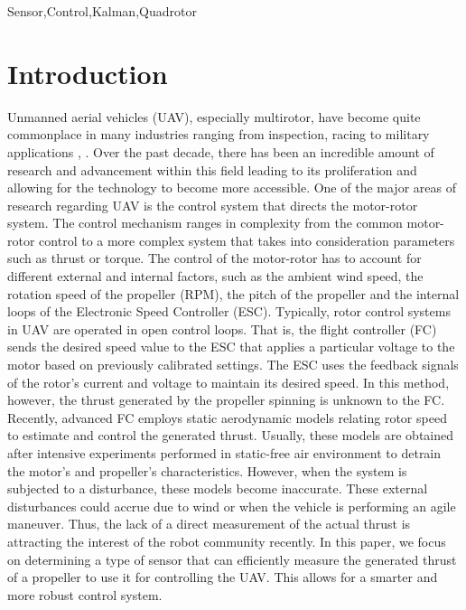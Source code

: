 \documentclass[conference]{IEEEtran}
\begin{document}
\begin{IEEEkeywords}
Sensor,Control,Kalman,Quadrotor
\end{IEEEkeywords}

\section{Introduction}
Unmanned aerial vehicles (UAV), especially multirotor, have become quite commonplace in many industries ranging from inspection, racing to military applications \cite{bara}, \cite{Mathe}. Over the past decade, there has been an incredible amount of research and advancement within this field leading to its proliferation and allowing for the technology to become more accessible. One of the major areas of research regarding UAV is the control system that directs the motor-rotor system. The control mechanism ranges in complexity from the common motor-rotor control to a more complex system that takes into consideration parameters such as thrust or torque. The control of the motor-rotor has to account for different external and internal factors, such as the ambient wind speed, the rotation speed of the propeller (RPM), the pitch of the propeller and the internal loops of the Electronic Speed Controller (ESC). Typically, rotor control systems in UAV are operated in open control loops. That is, the flight controller (FC) sends the desired speed value to the ESC that applies a particular voltage to the motor based on previously calibrated settings. The ESC uses the feedback signals of the rotor’s current and voltage to maintain its desired speed. In this method, however, the thrust generated by the propeller spinning is unknown to the FC. Recently, advanced FC employs static aerodynamic models relating rotor speed to estimate and control the generated thrust. Usually, these models are obtained after intensive experiments performed in static-free air environment to detrain the motor’s and propeller’s characteristics. However, when the system is subjected to a disturbance, these models become inaccurate. These external disturbances could accrue due to wind or when the vehicle is performing an agile maneuver. Thus, the lack of a direct measurement of the actual thrust is attracting the interest of the robot community recently. In this paper, we focus on determining a type of sensor that can efficiently measure the generated thrust of a propeller to use it for controlling the UAV. This allows for a smarter and more robust control system.
\end{document}
